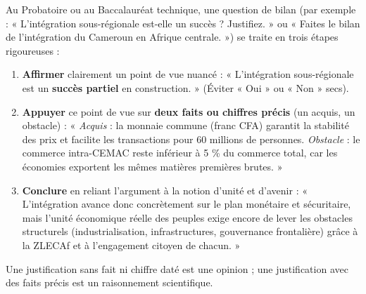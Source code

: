 \documentclass[11pt]{article}
\begin{document}
\begin{methode}
Au Probatoire ou au Baccalauréat technique, une question de bilan (par exemple : « L'intégration sous-régionale est-elle un succès ? Justifiez. » ou « Faites le bilan de l'intégration du Cameroun en Afrique centrale. ») se traite en trois étapes rigoureuses :
\begin{enumerate}
\item \textbf{Affirmer} clairement un point de vue nuancé : « L'intégration sous-régionale est un \textbf{succès partiel} en construction. » (Éviter « Oui » ou « Non » secs).
\item \textbf{Appuyer} ce point de vue sur \textbf{deux faits ou chiffres précis} (un acquis, un obstacle) : « \emph{Acquis} : la monnaie commune (franc CFA) garantit la stabilité des prix et facilite les transactions pour 60 millions de personnes. \emph{Obstacle} : le commerce intra-CEMAC reste inférieur à 5 \% du commerce total, car les économies exportent les mêmes matières premières brutes. »
\item \textbf{Conclure} en reliant l'argument à la notion d'unité et d'avenir : « L'intégration avance donc concrètement sur le plan monétaire et sécuritaire, mais l'unité économique réelle des peuples exige encore de lever les obstacles structurels (industrialisation, infrastructures, gouvernance frontalière) grâce à la ZLECAf et à l'engagement citoyen de chacun. »
\end{enumerate}
Une justification sans fait ni chiffre daté est une opinion ; une justification avec des faits précis est un raisonnement scientifique.
\end{methode}
\end{document}
